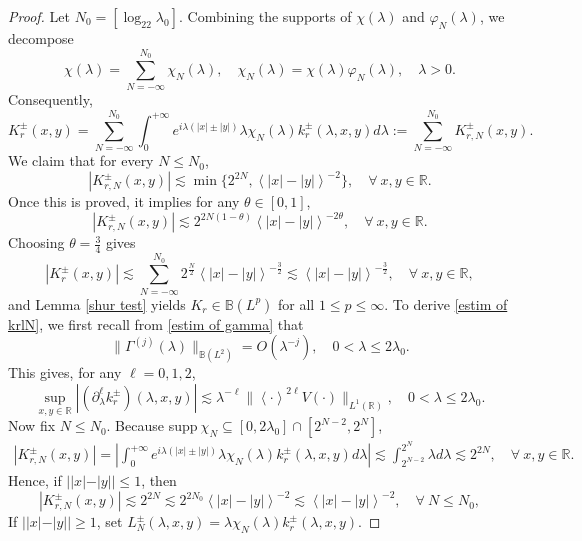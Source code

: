 \documentclass[reqno]{amsart}
\newcommand\R{\mathbb{R}}
\newcommand\B{\mathbb{B}}
\numberwithin{equation}{section}
\begin{document}
\begin{proof}
Let $N_0=[\log_22\lambda_0]$. Combining the supports of $\chi(\lambda)$ and $\varphi_N(\lambda)$, we decompose
\begin{equation*}
\chi(\lambda)=\sum_{N=-\infty}^{N_0}{\chi}_{N}(\lambda),\quad {\chi}_{N}(\lambda)=\chi(\lambda)\varphi_{N}(\lambda),\quad\lambda>0.
\end{equation*}
Consequently,
\begin{equation*}
K^{\pm}_{r}(x,y)=\sum_{N=-\infty}^{N_0}\int_{0}^{+\infty}e^{i\lambda(|x|\pm |y|)}\lambda{\chi}_{N}(\lambda)k^{\pm}_r(\lambda,x,y)d\lambda:=\sum_{N=-\infty}^{N_0}K^{\pm}_{r,N}(x,y).
\end{equation*}
We claim that for every  $N\leq N_0$,
\begin{equation}\label{estim of krlN}
|K^{\pm}_{r,N}(x,y)|\lesssim \min\{{2^{2N},\left<|x|-|y|\right>^{-2}}\},\quad \forall\ x,y\in\R.
\end{equation}
Once this is proved, it implies for any $\theta\in[0,1]$, 
 $$|K^{\pm}_{r,N}(x,y)|\lesssim2^{2N(1-\theta)}\left<|x|-|y|\right>^{-2\theta},\quad \forall\ x,y\in\R.$$
Choosing $\theta=\frac{3}{4}$ gives
$$|K^{\pm}_{r}(x,y)|\lesssim\sum_{N=-\infty}^{N_0}2^{\frac{N}{2}}\left<|x|-|y|\right>^{-\frac{3}{2}}\lesssim\left<|x|-|y|\right>^{-\frac{3}{2}},\quad \forall\ x,y\in\R,$$
and Lemma \ref{shur test} yields $K_r\in\B(L^p)$ for all $1\leq p\leq\infty$. To derive \eqref{estim of krlN}, we first recall from \eqref{estim of gamma} that
$$\|\Gamma^{(j)}(\lambda)\|_{\B(L^2)}=O(\lambda^{-j}),\quad 0<\lambda\leq2\lambda_0.$$
This gives, for any $\ell=0,1,2$,
\begin{equation}\label{estim of krN}
\sup_{x,y\in\R}\left|(\partial^{\ell}_{\lambda}k^{\pm}_r)(\lambda,x,y)\right|\lesssim\lambda^{-\ell}\big\|\left<\cdot\right>^{2\ell}V(\cdot)\big\|_{L^1(\R)},\quad  0<\lambda\leq2\lambda_0.
\end{equation}
Now fix $ N\leq N_0$. Because supp$\ \chi_N\subseteq [0,2\lambda_0]\cap[2^{N-2},2^N]$, 
\begin{align}\label{klbn}
|K^{\pm}_{r,N}(x,y)|=\left|\int_{0}^{+\infty}e^{i\lambda(|x|\pm |y|)}\lambda{\chi}_{N}(\lambda)k^{\pm}_r(\lambda,x,y)d\lambda\right|\lesssim\int_{2^{N-2}}^{2^{N}}\lambda d\lambda\lesssim2^{2N},\quad \forall \ x,y\in\R.
\end{align}
Hence, if $||x|-|y||\leq1$, then
$$|K^{\pm}_{r,N}(x,y)|\lesssim2^{2N}\lesssim2^{2N_0} \left<|x|-|y|\right>^{-2}\lesssim \left<|x|-|y|\right>^{-2},\quad \forall\ N\leq N_0 ,$$
If $||x|-|y||\geq1$, set $L^{\pm}_{N}(\lambda,x,y)=\lambda{\chi}_{N}(\lambda)k^{\pm}_r(\lambda,x,y)$.

\end{proof}
\end{document}
